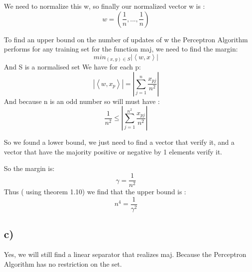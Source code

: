 We need to normalize this w, so finally our normalized vector w is :\[w=(\frac{1}{n},...,\frac{1}{n})\]

To find an upper bound on the number of updates of w the Perceptron Algorithm performs for any training set for the function maj, we need to find the margin: \[min_{(x,y)\in S}\left | \left \langle w,x \right \rangle \right |\]
And S is a normalised set
 We have for each p: 
 \[\left | \left \langle w,x_{p} \right \rangle \right |=\left | \sum_{j=1}^{n} \frac{x_{pj}}{n^{2}} \right |\]
 And because n is an odd number so will must have :
 \[\frac{1}{n^{2}}\leq \left | \sum_{j=1}^{n^{2}} \frac{x_{pj}}{n^{2}} \right |\]

So we found a lower bound, we just need to find a vector that  verify  it, and a vector that have the majority positive or negative by 1 elements verify it.

So the margin is: \[\gamma =\frac{1}{n^{2}}\]
Thus ( using theorem 1.10) we find that the upper bound is : 
\[n^{4} =\frac{1}{\gamma^{2}}\]
 
\subsection*{ c)}
 Yes, we will still find a linear separator that realizes maj. Because the Perceptron Algorithm has no restriction on the set. 
  
